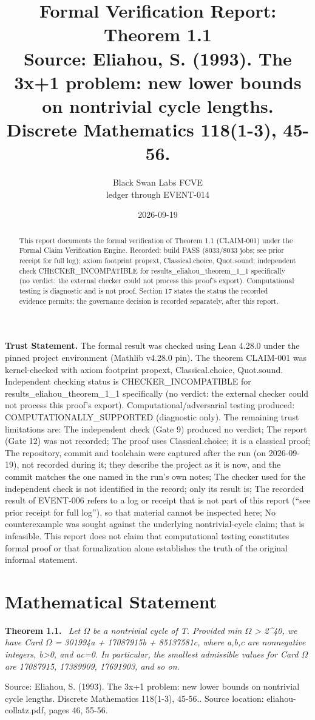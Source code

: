 \documentclass[11pt]{article}
\title{Formal Verification Report: Theorem 1.1\\[0.5em]{\large Source: Eliahou, S. (1993). The 3x+1 problem: new lower bounds on nontrivial cycle lengths. Discrete Mathematics 118(1-3), 45-56.}}
\author{Black Swan Labs FCVE \\ ledger through EVENT-014}
\date{2026-09-19}
\newenvironment{sourceresult}[1]{\par\medskip\noindent\textbf{#1.}\ \itshape}{\par\medskip}
\begin{document}
\maketitle

\noindent\textbf{Trust Statement.} The formal result was checked using Lean 4.28.0 under the pinned project environment (Mathlib v4.28.0 pin). The theorem CLAIM-001 was kernel-checked with axiom footprint propext, Classical.choice, Quot.sound. Independent checking status is CHECKER\_INCOMPATIBLE for results\_eliahou\_theorem\_1\_1 specifically (no verdict: the external checker could not process this proof's export). Computational/adversarial testing produced: COMPUTATIONALLY\_SUPPORTED (diagnostic only). The remaining trust limitations are: The independent check (Gate 9) produced no verdict; The report (Gate 12) was not recorded; The proof uses Classical.choice; it is a classical proof; The repository, commit and toolchain were captured after the run (on 2026-09-19), not recorded during it; they describe the project as it is now, and the commit matches the one named in the run's own notes; The checker used for the independent check is not identified in the record; only its result is; The recorded result of EVENT-006 refers to a log or receipt that is not part of this report (``see prior receipt for full log''), so that material cannot be inspected here; No counterexample was sought against the underlying nontrivial-cycle claim; that is infeasible. This report does not claim that computational testing constitutes formal proof or that formalization alone establishes the truth of the original informal statement.

\begin{abstract}
This report documents the formal verification of Theorem 1.1 (CLAIM-001) under the Formal Claim Verification Engine. Recorded: build PASS (8033/8033 jobs; see prior receipt for full log); axiom footprint propext, Classical.choice, Quot.sound; independent check CHECKER\_INCOMPATIBLE for results\_eliahou\_theorem\_1\_1 specifically (no verdict: the external checker could not process this proof's export). Computational testing is diagnostic and is not proof. Section 17 states the status the recorded evidence permits; the governance decision is recorded separately, after this report.
\end{abstract}

\section{Mathematical Statement}
\begin{sourceresult}{Theorem 1.1}
Let \ensuremath{\Omega} be a nontrivial cycle of T. Provided min \ensuremath{\Omega} > 2\textasciicircum{}40, we have Card \ensuremath{\Omega} = 301994a + 17087915b + 85137581c, where a,b,c are nonnegative integers, b>0, and ac=0. In particular, the smallest admissible values for Card \ensuremath{\Omega} are 17087915, 17389909, 17691903, and so on.
\end{sourceresult}
Source: Eliahou, S. (1993). The 3x+1 problem: new lower bounds on nontrivial cycle lengths. Discrete Mathematics 118(1-3), 45-56.. Source location: eliahou-collatz.pdf, pages 46, 55-56.
\end{document}
